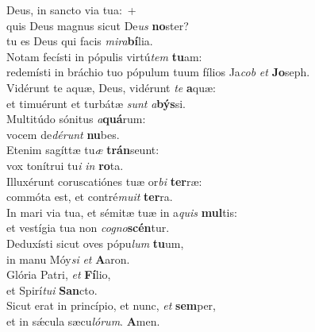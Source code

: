 \oddverse Deus, in sancto via tua:~+\\
\oddverse  quis Deus magnus sicut De\textit{us} \textbf{no}ster?~\*\\
\oddverse tu es Deus qui facis \textit{mi}\textit{ra}\textbf{bí}lia.\\
\evenverse Notam fecísti in pópulis virtú\textit{tem} \textbf{tu}am:~\*\\
\evenverse redemísti in bráchio tuo pópulum tuum fílios Ja\textit{cob} \textit{et} \textbf{Jo}seph.\\
\oddverse Vidérunt te aquæ, Deus, vidérunt \textit{te} \textbf{a}quæ:~\*\\
\oddverse et timuérunt et turbátæ \textit{sunt} \textit{a}\textbf{býs}si.\\
\evenverse Multitúdo sónitus \textit{a}\textbf{quá}rum:~\*\\
\evenverse vocem de\textit{dé}\textit{runt} \textbf{nu}bes.\\
\oddverse Etenim sagíttæ tu\textit{æ} \textbf{trán}seunt:~\*\\
\oddverse vox tonítrui tu\textit{i} \textit{in} \textbf{ro}ta.\\
\evenverse Illuxérunt coruscatiónes tuæ or\textit{bi} \textbf{ter}ræ:~\*\\
\evenverse commóta est, et contré\textit{mu}\textit{it} \textbf{ter}ra.\\
\oddverse In mari via tua, et sémitæ tuæ in a\textit{quis} \textbf{mul}tis:~\*\\
\oddverse et vestígia tua non \textit{co}\textit{gno}\textbf{scén}tur.\\
\evenverse Deduxísti sicut oves pópu\textit{lum} \textbf{tu}um,~\*\\
\evenverse in manu Móy\textit{si} \textit{et} \textbf{A}aron.\\
\oddverse Glória Patri, \textit{et} \textbf{Fí}lio,~\*\\
\oddverse et Spirí\textit{tu}\textit{i} \textbf{San}cto.\\
\evenverse Sicut erat in princípio, et nunc, \textit{et} \textbf{sem}per,~\*\\
\evenverse et in sǽcula sæcu\textit{ló}\textit{rum}. \textbf{A}men.\\
